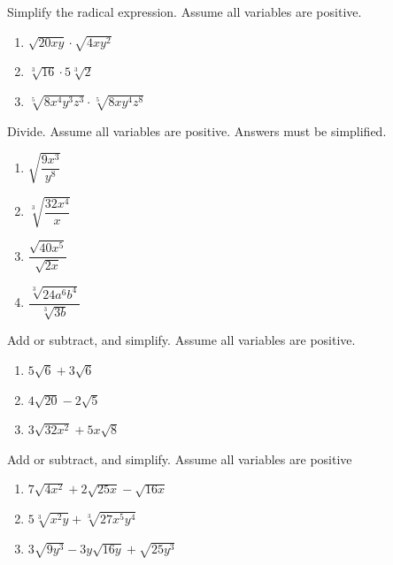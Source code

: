 \documentclass[en,12pt]{elegantbook}
\providecommand{\tightlist}{%
  \setlength{\itemsep}{0pt}\setlength{\parskip}{0pt}}
\providecommand{\tightlist}{%
  \setlength{\itemsep}{0pt}\setlength{\parskip}{0pt}}
\let\BeginKnitrBlock\begin \let\EndKnitrBlock\end
\begin{document}
\BeginKnitrBlock{exercise}
\protect\hypertarget{exr:unnamed-chunk-96}{}{\label{exr:unnamed-chunk-96} }
Simplify the radical expression. Assume all variables are positive.

\begin{enumerate}
\def\labelenumi{\arabic{enumi}.}
\tightlist
\item
  \(\sqrt{20xy}\cdot\sqrt{4xy^2}\)
\item
  \(\sqrt[3]{16}\cdot5\sqrt[3]{2}\)
\item
  \(\sqrt[5]{8x^4y^3z^3}\cdot\sqrt[5]{8xy^4z^8}\)
\end{enumerate}
\EndKnitrBlock{exercise}

\BeginKnitrBlock{exercise}
\protect\hypertarget{exr:unnamed-chunk-97}{}{\label{exr:unnamed-chunk-97} }
Divide. Assume all variables are positive. Answers must be simplified.

\begin{enumerate}
\def\labelenumi{\arabic{enumi}.}
\tightlist
\item
  \(\sqrt{\dfrac{9x^3}{y^8}}\)
\item
  \(\sqrt[3]{\dfrac{32x^4}{x}}\)
\item
  \(\dfrac{\sqrt{40x^5}}{\sqrt{2x}}\)
\item
  \(\dfrac{\sqrt[3]{24a^6b^4}}{\sqrt[3]{3b}}\)
\end{enumerate}
\EndKnitrBlock{exercise}

\BeginKnitrBlock{exercise}
\protect\hypertarget{exr:unnamed-chunk-98}{}{\label{exr:unnamed-chunk-98} }
Add or subtract, and simplify. Assume all variables are positive.

\begin{enumerate}
\def\labelenumi{\arabic{enumi}.}
\tightlist
\item
  \(5\sqrt6+3\sqrt6\)
\item
  \(4\sqrt{20}-2\sqrt5\)
\item
  \(3\sqrt{32x^2}+5x\sqrt{8}\)
\end{enumerate}
\EndKnitrBlock{exercise}

\BeginKnitrBlock{exercise}
\protect\hypertarget{exr:unnamed-chunk-99}{}{\label{exr:unnamed-chunk-99} }
Add or subtract, and simplify. Assume all variables are positive

\begin{enumerate}
\def\labelenumi{\arabic{enumi}.}
\tightlist
\item
  \(7\sqrt{4x^2}+2\sqrt{25x}-\sqrt{16x}\)
\item
  \(5\sqrt[3]{x^2y}+\sqrt[3]{27x^5y^4}\)
\item
  \(3\sqrt{9y^3}-3y\sqrt{16y}+\sqrt{25y^3}\)
\end{enumerate}
\EndKnitrBlock{exercise}
\end{document}
